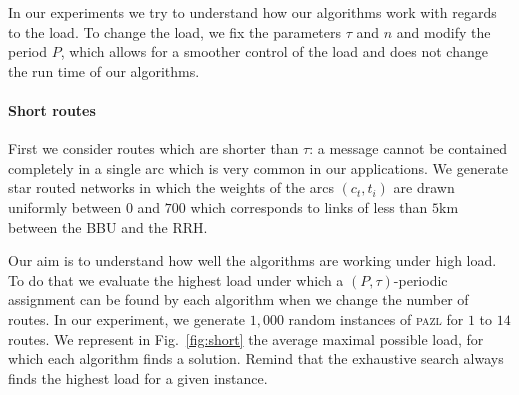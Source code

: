 \documentclass[10pt, conference, letterpaper]{IEEEtran}
\newcommand\pazl{\textsc{pazl}\xspace}
\begin{document}

       In our experiments we try to understand how our algorithms work with regards to the load. To change the load, we fix the parameters $\tau$ and $n$ and modify the period $P$, which allows for a smoother control of the load and does not change the run time of our algorithms.
      

      \paragraph{Short routes}
      
      First we consider routes which are shorter than $\tau$: a message cannot be contained completely in a single arc which is very common in our applications. We generate star routed networks in which the weights of the arcs $(c_t,t_i)$ are drawn uniformly between $0$ and $700$ which corresponds to links of less than $5$km between the BBU and the RRH. 
      
      Our aim is to understand how well the algorithms are working under high load. To do that we evaluate the highest load 
      under which a $(P,\tau)$-periodic assignment can be found by each algorithm when we change the number of routes. 
      In our experiment, we generate $1,000$ random instances of \pazl for $1$ to $14$ routes. We represent in Fig.~\ref{fig:short} the average maximal possible load, for which each algorithm finds a solution. Remind that the exhaustive search always finds the highest load for a given instance. 
      
\end{document}
